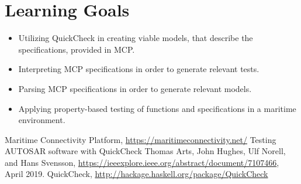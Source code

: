 \documentclass[a4paper]{article}
\begin{document}
\section*{Learning Goals}
\begin{itemize}
	\item Utilizing QuickCheck in creating viable models, that describe the specifications, provided in MCP.
	\item Interpreting MCP specifications in order to generate relevant tests.
	\item Parsing MCP specifications in order to generate relevant models.
	\item Applying property-based testing of functions and specifications in a maritime environment.
\end{itemize}

\begin{thebibliography}{2}
		Maritime Connectivity Platform,
		\url{https://maritimeconnectivity.net/}
		Testing AUTOSAR software with QuickCheck
		Thomas Arts, John Hughes, Ulf Norell, and Hans Svensson,
		\url{https://ieeexplore.ieee.org/abstract/document/7107466},
		April 2019.
		QuickCheck,
	\url{http://hackage.haskell.org/package/QuickCheck}
\end{thebibliography}
\end{document}
